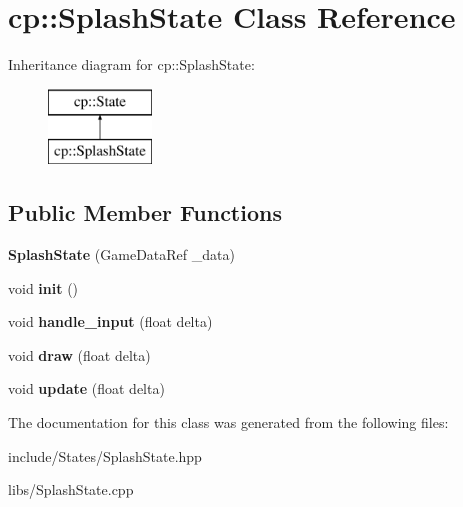 \hypertarget{classcp_1_1_splash_state}{}\section{cp\+:\+:Splash\+State Class Reference}
\label{classcp_1_1_splash_state}
Inheritance diagram for cp\+:\+:Splash\+State\+:\begin{figure}[H]
\begin{center}
\leavevmode
\includegraphics[height=2.000000cm]{classcp_1_1_splash_state}
\end{center}
\end{figure}
\subsection*{Public Member Functions}
\begin{DoxyCompactItemize}
\item 
\mbox{\label{classcp_1_1_splash_state_a13c8bbda231f1a6b61a7b48f5d5d78fa}} 
{\bfseries Splash\+State} (Game\+Data\+Ref \+\_\+data)
\item 
\mbox{\label{classcp_1_1_splash_state_a04c76eeff72330b606761cc3cfc02138}} 
void {\bfseries init} ()
\item 
\mbox{\label{classcp_1_1_splash_state_a38939d73fbb4e3b6fa377fcc8fbc1dae}} 
void {\bfseries handle\+\_\+input} (float delta)
\item 
\mbox{\label{classcp_1_1_splash_state_a4ff5d8ca42efef65c8f572a29af89ec0}} 
void {\bfseries draw} (float delta)
\item 
\mbox{\label{classcp_1_1_splash_state_a3f906e4b3904c2813e18a63000b97ac8}} 
void {\bfseries update} (float delta)
\end{DoxyCompactItemize}


The documentation for this class was generated from the following files\+:\begin{DoxyCompactItemize}
\item 
include/\+States/Splash\+State.\+hpp\item 
libs/Splash\+State.\+cpp\end{DoxyCompactItemize}
